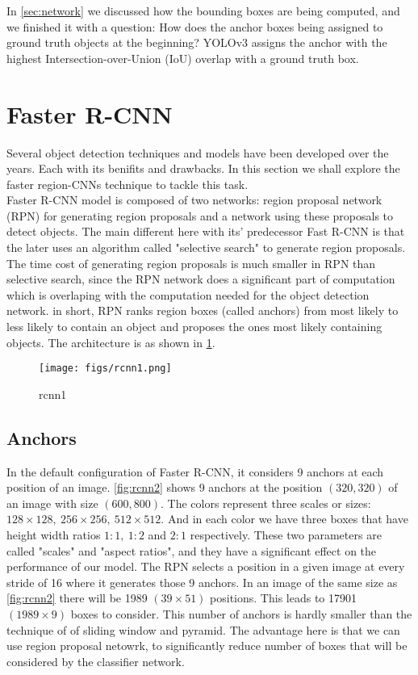 In \cref{sec:network} we discussed how the bounding boxes are being computed, and we finished it with a question: How does the anchor boxes being
assigned to ground truth objects at the beginning? YOLOv3 assigns the anchor with the highest Intersection-over-Union (IoU) overlap with a ground
truth box.

\section{Faster R-CNN}
Several object detection techniques and models have been developed over the years. Each with its benifits and drawbacks. In this section we shall explore the faster region-CNNs technique to tackle this task. \\

Faster R-CNN model is composed of two networks: region proposal network (RPN) for generating region proposals and a network using these proposals to detect objects. The main different here with its' predecessor Fast R-CNN is that the later uses an algorithm called "selective search" to generate region proposals. The time cost of generating region proposals is much smaller in RPN than selective search, since the RPN network does a significant part of computation which is overlaping  with the computation needed for the  object detection network. in short, RPN ranks region boxes (called anchors) from most likely to less likely to contain an object and proposes the ones most likely containing objects. The architecture is as shown in  \cref{fig:rcnn1}.

\begin{figure}[H]
	\centering
	\texttt{[image: figs/rcnn1.png]}
	\caption{rcnn1}\label{fig:rcnn1}
\end{figure}

\subsection{Anchors}
In the default configuration of Faster R-CNN, it considers 9 anchors at each position of an image. \cref{fig:rcnn2} shows 9 anchors at the position $(320, 320)$ of an image with size $(600, 800)$. The colors represent three scales or sizes: $128 \times 128,\ 256 \times 256,\ 512 \times 512$. And in each color we have three boxes that have height width ratios $1:1,\ 1:2$ and $2:1$ respectively. These two parameters are called "scales" and "aspect ratios", and they have a significant effect on the performance of our model.
The RPN selects a position in a given image at every stride of 16 where it generates those 9 anchors. In an image of the same size as \cref{fig:rcnn2}  there will be 1989 $(39 \times 51)$ positions. This leads to 17901 $(1989 \times 9)$ boxes to consider. This number of anchors is hardly smaller than the technique of of sliding window and pyramid. The advantage here is that we can use region proposal netowrk, to significantly reduce number of boxes that will be considered by the classifier network.

